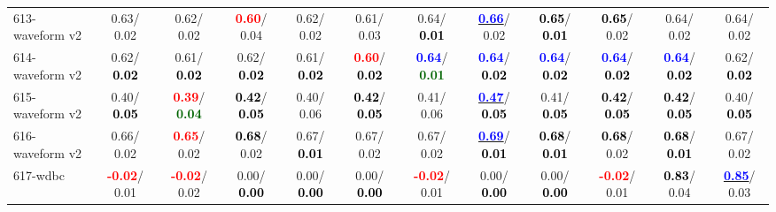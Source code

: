 \begin{table}[h]
\begin{center}
{\begin{tabular}{lc|c|c|c|c|c|c|c|c|c|c}
613-waveform v2 &   0.63/  0.02 &   0.62/  0.02 & \textcolor{red}{\textbf{  0.60}}/  0.04 &   0.62/  0.02 &   0.61/  0.03 &   0.64/\textcolor{black}{\textbf{  0.01}} & \underline{\textcolor{blue}{\textbf{  0.66}}}/  0.02 & \textcolor{black}{\textbf{  0.65}}/\textcolor{black}{\textbf{  0.01}} & \textcolor{black}{\textbf{  0.65}}/  0.02 &   0.64/  0.02 &   0.64/  0.02 \\
614-waveform v2 &   0.62/\textcolor{black}{\textbf{  0.02}} &   0.61/\textcolor{black}{\textbf{  0.02}} &   0.62/\textcolor{black}{\textbf{  0.02}} &   0.61/\textcolor{black}{\textbf{  0.02}} & \textcolor{red}{\textbf{  0.60}}/\textcolor{black}{\textbf{  0.02}} & \textcolor{blue}{\textbf{  0.64}}/\textcolor{darkgreen}{\textbf{  0.01}} & \textcolor{blue}{\textbf{  0.64}}/\textcolor{black}{\textbf{  0.02}} & \textcolor{blue}{\textbf{  0.64}}/\textcolor{black}{\textbf{  0.02}} & \textcolor{blue}{\textbf{  0.64}}/\textcolor{black}{\textbf{  0.02}} & \textcolor{blue}{\textbf{  0.64}}/\textcolor{black}{\textbf{  0.02}} &   0.62/\textcolor{black}{\textbf{  0.02}} \\
615-waveform v2 &   0.40/\textcolor{black}{\textbf{  0.05}} & \textcolor{red}{\textbf{  0.39}}/\textcolor{darkgreen}{\textbf{  0.04}} & \textcolor{black}{\textbf{  0.42}}/\textcolor{black}{\textbf{  0.05}} &   0.40/  0.06 & \textcolor{black}{\textbf{  0.42}}/\textcolor{black}{\textbf{  0.05}} &   0.41/  0.06 & \underline{\textcolor{blue}{\textbf{  0.47}}}/\textcolor{black}{\textbf{  0.05}} &   0.41/\textcolor{black}{\textbf{  0.05}} & \textcolor{black}{\textbf{  0.42}}/\textcolor{black}{\textbf{  0.05}} & \textcolor{black}{\textbf{  0.42}}/\textcolor{black}{\textbf{  0.05}} &   0.40/\textcolor{black}{\textbf{  0.05}} \\ \hline
616-waveform v2 &   0.66/  0.02 & \textcolor{red}{\textbf{  0.65}}/  0.02 & \textcolor{black}{\textbf{  0.68}}/  0.02 &   0.67/\textcolor{black}{\textbf{  0.01}} &   0.67/  0.02 &   0.67/  0.02 & \underline{\textcolor{blue}{\textbf{  0.69}}}/\textcolor{black}{\textbf{  0.01}} & \textcolor{black}{\textbf{  0.68}}/\textcolor{black}{\textbf{  0.01}} & \textcolor{black}{\textbf{  0.68}}/  0.02 & \textcolor{black}{\textbf{  0.68}}/\textcolor{black}{\textbf{  0.01}} &   0.67/  0.02 \\
617-wdbc & \textcolor{red}{\textbf{ -0.02}}/  0.01 & \textcolor{red}{\textbf{ -0.02}}/  0.02 &   0.00/\textcolor{black}{\textbf{  0.00}} &   0.00/\textcolor{black}{\textbf{  0.00}} &   0.00/\textcolor{black}{\textbf{  0.00}} & \textcolor{red}{\textbf{ -0.02}}/  0.01 &   0.00/\textcolor{black}{\textbf{  0.00}} &   0.00/\textcolor{black}{\textbf{  0.00}} & \textcolor{red}{\textbf{ -0.02}}/  0.01 & \textcolor{black}{\textbf{  0.83}}/  0.04 & \underline{\textcolor{blue}{\textbf{  0.85}}}/  0.03 \\

\end{tabular}}
\end{center}
\end{table}
